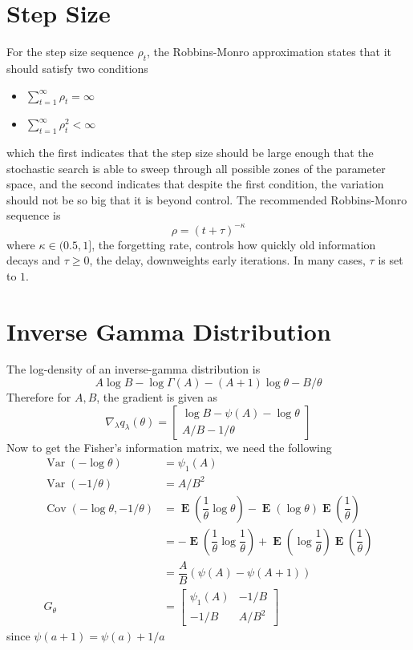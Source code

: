 \documentclass[12pt]{article}
\DeclareMathOperator{\Cov}{Cov}
\DeclareMathOperator{\Var}{Var}
\DeclareMathOperator{\E}{\mathbf{E}}
\begin{document}
\section{Step Size}
For the step size sequence $\rho_{t}$, the Robbins-Monro approximation states that it should satisfy two conditions
\begin{itemize}
  \item $\displaystyle\sum_{t=1}^{\infty}\rho_{t}=\infty$
  \item $\displaystyle\sum_{t=1}^{\infty}\rho_{t}^{2} < \infty$
  \end{itemize}
  which the first indicates that the step size should be large enough that the stochastic search is able to sweep through all possible zones of the parameter space, and the second indicates that despite the first condition, the variation should not be so big that it is beyond control. The recommended Robbins-Monro sequence is
  \begin{equation}
  \rho = (t+\tau)^{-\kappa}
  \end{equation}
  where $\kappa\in (0.5,1]$, the forgetting rate, controls how quickly old information decays and $\tau \geq 0$, the delay, downweights early iterations. In many cases, $\tau$ is set to $1$.
\section{Inverse Gamma Distribution}
The log-density of an inverse-gamma distribution is
\begin{equation}
  A\log B -\log \Gamma(A)-(A+1)\log \theta - B/\theta
\end{equation}
Therefore for $A,B$, the gradient is given as
\begin{equation}
  \nabla_{\lambda}q_{\lambda}(\theta) = \begin{bmatrix}\log B -\psi(A)-\log\theta\\ A/B-1/\theta \end{bmatrix}
\end{equation}
Now to get the Fisher's information matrix, we need the following
\begin{align}
  \Var(-\log \theta) &= \psi_{1}(A)\\
  \Var(-1/\theta) &= A/B^{2}\\
  \Cov(-\log\theta,-1/\theta) &= \E\left(\dfrac{1}{\theta}\log\theta\right)-\E(\log\theta)\E\left(\dfrac{1}{\theta}\right)\\
  &= -\E\left(\dfrac{1}{\theta}\log\dfrac{1}{\theta}\right)+\E\left(\log\dfrac{1}{\theta}\right)\E\left(\dfrac{1}{\theta}\right)\\
  &= \dfrac{A}{B}\left(\psi(A)-\psi(A+1)\right)\\
  G_{\theta} &= \begin{bmatrix}\psi_{1}(A) & -1/B \\ -1/B & A/B^{2} \end{bmatrix}
\end{align}
since $\psi(a+1)=\psi(a)+1/a$
\end{document}
